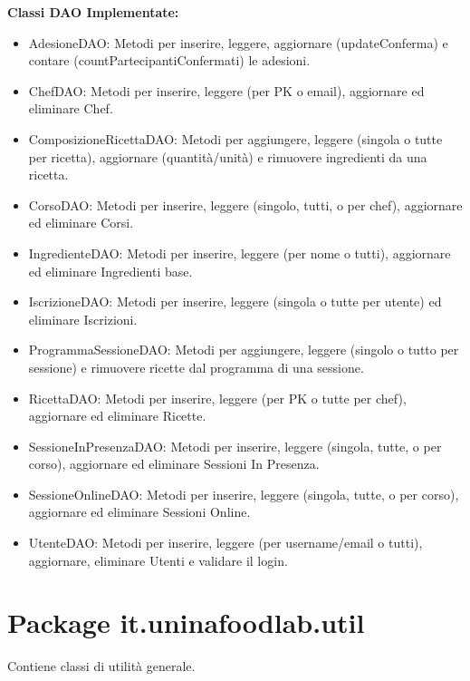 \documentclass[a4paper, 12pt]{article}
\begin{document}
\textbf{Classi DAO Implementate:}
\begin{itemize}
    \item AdesioneDAO: Metodi per inserire, leggere, aggiornare (updateConferma) e contare (countPartecipantiConfermati) le adesioni.
    \item ChefDAO: Metodi per inserire, leggere (per PK o email), aggiornare ed eliminare Chef.
    \item ComposizioneRicettaDAO: Metodi per aggiungere, leggere (singola o tutte per ricetta), aggiornare (quantità/unità) e rimuovere ingredienti da una ricetta.
    \item CorsoDAO: Metodi per inserire, leggere (singolo, tutti, o per chef), aggiornare ed eliminare Corsi.
    \item IngredienteDAO: Metodi per inserire, leggere (per nome o tutti), aggiornare ed eliminare Ingredienti base.
    \item IscrizioneDAO: Metodi per inserire, leggere (singola o tutte per utente) ed eliminare Iscrizioni.
    \item ProgrammaSessioneDAO: Metodi per aggiungere, leggere (singolo o tutto per sessione) e rimuovere ricette dal programma di una sessione.
    \item RicettaDAO: Metodi per inserire, leggere (per PK o tutte per chef), aggiornare ed eliminare Ricette.
    \item SessioneInPresenzaDAO: Metodi per inserire, leggere (singola, tutte, o per corso), aggiornare ed eliminare Sessioni In Presenza.
    \item SessioneOnlineDAO: Metodi per inserire, leggere (singola, tutte, o per corso), aggiornare ed eliminare Sessioni Online.
    \item UtenteDAO: Metodi per inserire, leggere (per username/email o tutti), aggiornare, eliminare Utenti e validare il login.
\end{itemize}

\section{Package it.uninafoodlab.util}
Contiene classi di utilità generale.
\end{document}
